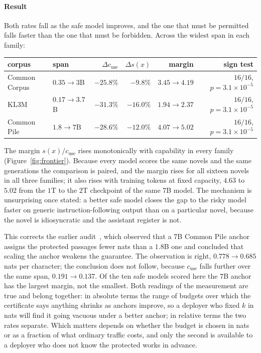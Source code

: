 \paragraph{Result}
Both rates fall as the safe model improves, and the one that must be permitted falls faster than
the one that must be forbidden. Across the widest span in each family:
\begin{center}\small
\begin{tabular}{@{}llrrrr@{}}
\toprule
corpus & span & $\Delta c_{\mathrm{use}}$ & $\Delta s(x)$ & margin & sign test \\
\midrule
Common Corpus & $0.35 \to 3$B   & $-25.8\%$ & $-9.8\%$  & $3.45 \to 4.19$ & $16/16$, $p = 3.1\times10^{-5}$ \\
KL3M          & $0.17 \to 3.7$B & $-31.3\%$ & $-16.0\%$ & $1.94 \to 2.37$ & $16/16$, $p = 3.1\times10^{-5}$ \\
Common Pile   & $1.8 \to 7$B    & $-28.6\%$ & $-12.0\%$ & $4.07 \to 5.02$ & $16/16$, $p = 3.1\times10^{-5}$ \\
\bottomrule
\end{tabular}
\end{center}
The margin $s(x)/c_{\mathrm{use}}$ rises monotonically with capability in every family
(Figure~\ref{fig:frontier}). Because every model scores the same novels and the same generations
the comparison is paired, and the margin rises for all sixteen novels in all three families; it
also rises with training tokens at fixed capacity, $4.63$ to $5.02$ from the $1$T to the $2$T
checkpoint of the same $7$B model. The mechanism is unsurprising once stated: a better safe model
closes the gap to the risky model faster on generic instruction-following output than on a
particular novel, because the novel is idiosyncratic and the assistant register is not.

This corrects the earlier audit~\citep{vijayavallabh2026audit}, which observed that a $7$B Common
Pile anchor assigns the protected passages fewer nats than a $1.8$B one and concluded that scaling
the anchor weakens the guarantee. The observation is right, $0.778 \to 0.685$ nats per character;
the conclusion does not follow, because $c_{\mathrm{use}}$ falls further over the same span,
$0.191 \to 0.137$. Of the ten safe models scored here the $7$B anchor has the largest margin, not
the smallest. Both readings of the measurement are true and belong together: in absolute terms the
range of budgets over which the certificate says anything shrinks as anchors improve, so a deployer
who fixed $k$ in nats will find it going vacuous under a better anchor; in relative terms the two
rates separate. Which matters depends on whether the budget is chosen in nats or as a fraction of
what ordinary traffic costs, and only the second is available to a deployer who does not know the
protected works in advance.

